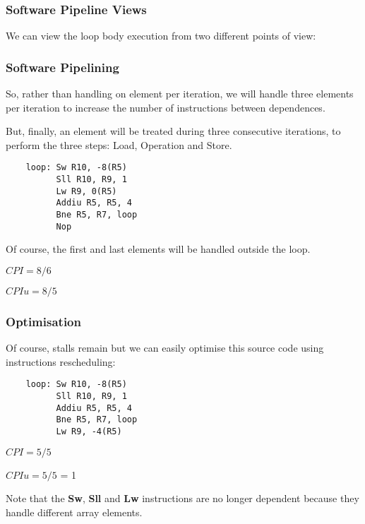 
\begin{frame}
  \frametitle{Software Pipeline Views}

  We can view the loop body execution from two different points of view:

  \begin{center}
  \end{center}
\end{frame}


\begin{frame}[containsverbatim]
  \frametitle{Software Pipelining}

  So, rather than handling on element per iteration, we will handle
  three elements per iteration to increase the number of instructions
  between dependences.

  \nl

  But, finally, an element will be treated during three consecutive
  iterations, to perform the three steps: Load, Operation and Store.

  \begin{verbatim}
    loop: Sw R10, -8(R5)
          Sll R10, R9, 1
          Lw R9, 0(R5)
          Addiu R5, R5, 4
          Bne R5, R7, loop
          Nop
  \end{verbatim}

  Of course, the first and last elements will be handled outside the loop.

  \nl

  $CPI = 8 / 6$

  $CPIu = 8 / 5$
\end{frame}


\begin{frame}[containsverbatim]
  \frametitle{Optimisation}

  Of course, stalls remain but we can easily optimise this source code
  using instructions rescheduling:

  \begin{verbatim}
    loop: Sw R10, -8(R5)
          Sll R10, R9, 1
          Addiu R5, R5, 4
          Bne R5, R7, loop
          Lw R9, -4(R5)
  \end{verbatim}

  \nl

  $CPI = 5 / 5$

  $CPIu = 5 / 5$ \alert{= 1}

  \nl

  Note that the \textbf{Sw}, \textbf{Sll} and \textbf{Lw} instructions
  are no longer dependent because they handle different array elements.
\end{frame}

